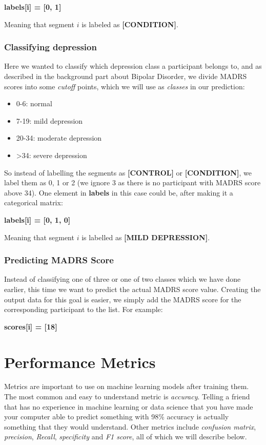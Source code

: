 \textbf{labels[i] = [0, 1]}

\noindent Meaning that segment $i$ is labeled as \textbf{[CONDITION]}.

\subsubsection{Classifying depression}
Here we wanted to classify which depression class a participant belongs to, and as described in the background part about Bipolar Disorder, 
we divide MADRS scores into some \textit{cutoff} points, which we will use as \textit{classes} in our prediction:

\begin{itemize}
  \item 0-6: normal
  \item 7-19: mild depression
  \item 20-34: moderate depression
  \item >34: severe depression
\end{itemize}

So instead of labelling the segments as \textbf{[CONTROL]} or \textbf{[CONDITION]}, we label them as 0, 1 or 2 (we ignore 3 as there is no participant with 
MADRS score above 34). One element in \textbf{labels} in this case could be, after making it a categorical matrix:

\textbf{labels[i] = [0, 1, 0]}

\noindent Meaning that segment $i$ is labelled as \textbf{[MILD DEPRESSION]}.

\subsubsection{Predicting MADRS Score}

Instead of classifying one of three or one of two classes which we have done earlier, this time we want to predict the actual MADRS score value. 
Creating the output data for this goal is easier, we simply add the MADRS score for the corresponding participant to the list. For example:

\textbf{scores[i] = [18]}

\section{Performance Metrics}

Metrics are important to use on machine learning models after training them. The most common and easy to understand metric is \textit{accuracy}. 
Telling a friend that has no experience in machine learning or data science that you have made your computer able to predict something with 98\% accuracy
is actually something that they would understand. Other metrics include \textit{confusion matrix}, \textit{precision}, \textit{Recall}, 
\textit{specificity} and \textit{F1 score}, all of which we will describe below.

